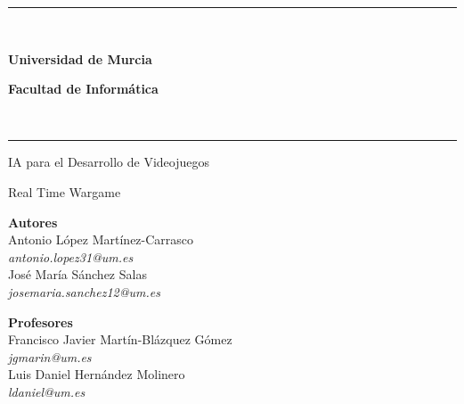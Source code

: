 \documentclass[a4paper,10pt]{article}
\begin{document}
\begin{center}
\rule{100mm}{0.1mm} \\
\vspace{5mm}
\begin{Huge}
 \textbf{Universidad de Murcia}\\ \vspace{10mm}
\end{Huge}
\begin{huge}
 \textbf{Facultad de Informática}
\end{huge}
\vspace{5mm} \\
\rule{100mm}{0.5mm}

\vspace{20mm}

\begin{Huge}
 IA para el Desarrollo de Videojuegos \\ \vspace{5mm}
\end{Huge}

\begin{LARGE}
 Real Time Wargame
\end{LARGE}

\vspace{15mm}

\begin{Large}
 \textbf{Autores} \\ \vspace{2mm}
 Antonio López Martínez-Carrasco\\ \vspace{2mm}
 \textit{antonio.lopez31@um.es} \\ \vspace{4mm}
 José María Sánchez Salas\\ \vspace{2mm}
 \textit{josemaria.sanchez12@um.es}
\end{Large}

\vspace{7mm}

\begin{Large}
 \textbf{Profesores} \\ \vspace{2mm}
 Francisco Javier Martín-Blázquez Gómez \\ \vspace{2mm}
 \textit{jgmarin@um.es} \\ \vspace{4mm}
 Luis Daniel Hernández Molinero \\ \vspace{2mm}
 \textit{ldaniel@um.es}
\end{Large}
\end{center}
\newpage
\pagestyle{fancy}
\renewcommand{\headrulewidth}{0.5pt} %
\renewcommand{\footrulewidth}{0.5pt}
\tableofcontents
\newpage
\end{document}
